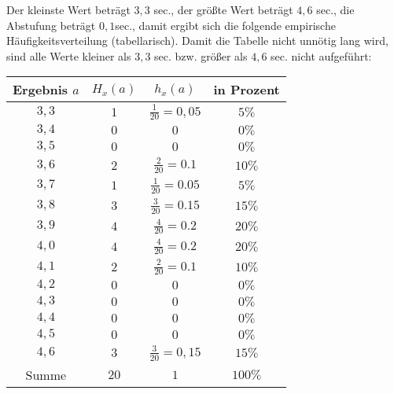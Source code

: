 \begin{MIntro}
\begin{MExample}
Der kleinste Wert beträgt $3,3$ sec., der größte Wert beträgt $4,6$ sec., die Abstufung beträgt $0,1$sec., damit ergibt sich die folgende empirische Häufigkeitsverteilung (tabellarisch).
Damit die Tabelle nicht unnötig lang wird, sind alle Werte kleiner als $3,3$ sec. bzw. größer als $4,6$ sec. nicht aufgeführt:
\begin{center}
\begin{tabular}{|c|c|c|c|}
\hline
Ergebnis $a$ & $H_{x}(a)$ & $h_{x}(a)$ & in Prozent \\ \hline
$3,3$ & $1$ & $\frac{1}{20}=0,05$ & $5\%$ \\
$3,4$ & $0$ & $0$ & $0\%$ \\
$3,5$ & $0$ & $0$ & $0\%$ \\
$3,6$ & $2$ & $\frac{2}{20}=0.1$ & $10\%$\\
$3,7$ & $1$ & $\frac{1}{20}=0.05$ & $5\%$\\
$3,8$ & $3$ & $\frac{3}{20}=0.15$ & $15\%$\\
$3,9$ & $4$ & $\frac{4}{20}=0.2$ & $20\%$ \\
$4,0$ & $4$ & $\frac{4}{20}=0.2$ & $20\%$ \\
$4,1$ & $2$ & $\frac{2}{20}=0.1$ & $10\%$\\
$4,2$ & $0$ & $0$ & $0\%$ \\
$4,3$ & $0$ & $0$ & $0\%$ \\
$4,4$ & $0$ & $0$ & $0\%$ \\
$4,5$ & $0$ & $0$ & $0\%$\\
$4,6$ & $3$ & $\frac{3}{20}=0,15$ & $15\%$\\ \hline
Summe & $20$ & $1$ & $100\%$\\ \hline
\end{tabular}
\end{center}
\end{MExample}

\end{MIntro}

